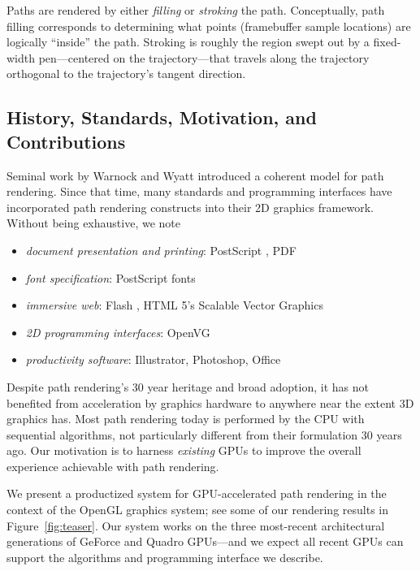 Paths are rendered by either {\em filling} or {\em stroking} the path.
Conceptually, path filling corresponds to determining what points
(framebuffer sample locations) are logically ``inside'' the path.
Stroking is roughly the region swept out by a fixed-width pen---centered
on the trajectory---that travels along the trajectory orthogonal to the
trajectory's tangent direction.

\subsection{History, Standards, Motivation, and Contributions}

Seminal work by Warnock and Wyatt
 introduced a coherent model
for path rendering.  Since that time, many standards and programming
interfaces have incorporated path rendering constructs into their
2D graphics framework.  Without being exhaustive, we note
\begin{itemize}
\item {\em document presentation and printing}: PostScript \cite{PLRM}, PDF \cite{PDF-Spec}
\item {\em font specification}: PostScript fonts \cite{Type1-Spec}
\item {\em immersive web}: Flash \cite{SWF-File-Format}, HTML 5's Scalable Vector Graphics \cite{SVG-Spec}
\item {\em 2D programming interfaces}: OpenVG \cite{OpenVG-Spec}
\item {\em productivity software}: Illustrator, Photoshop, Office
\end{itemize}
Despite path rendering's 30 year heritage and broad adoption, it has
not benefited from acceleration by graphics hardware to anywhere near 
the extent 3D graphics has.  Most path rendering today is performed
by the CPU with sequential algorithms, not particularly different from
their formulation 30 years ago.  Our motivation is to harness {\em existing}
GPUs to improve the overall experience achievable with path rendering.

We present a productized system for GPU-accelerated path rendering in
the context of the OpenGL graphics system; see some of our rendering results
in Figure~\ref{fig:teaser}.  Our system works on the three most-recent
architectural generations of GeForce and Quadro GPUs---and we expect
all recent GPUs can support the algorithms and programming interface
we describe.

